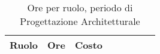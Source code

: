 \begin{table}[H]
\begin{tabular}{lccccccc}
\toprule
    \textbf{Ruolo}  & \textbf{Ore} & \textbf{Costo} \\
    \midrule
    
    	
    
    \bottomrule
\end{tabular}
\caption{Ore per ruolo, periodo di Progettazione Architetturale}
\end{table}
